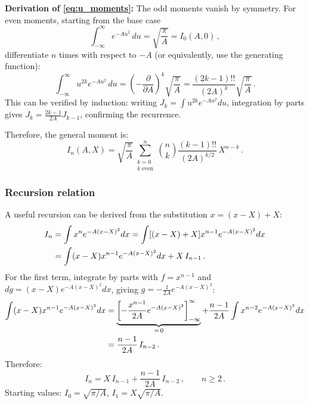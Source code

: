 \textbf{Derivation of \cref{eq:u_moments}:} The odd moments vanish by symmetry.
For even moments, starting from the base case
\begin{equation}
  \int_{-\infty}^{\infty}e^{-Au^2}\,du = \sqrt{\frac{\pi}{A}} = I_0(A,0)\,,
\end{equation}
differentiate $n$ times with respect to $-A$ (or equivalently, use the generating function):
\begin{equation}
  \int_{-\infty}^{\infty}u^{2k}e^{-Au^2}\,du
  = \left(-\frac{\partial}{\partial A}\right)^k\sqrt{\frac{\pi}{A}}
  = \frac{(2k-1)!!}{(2A)^k}\sqrt{\frac{\pi}{A}}\,.
\end{equation}
This can be verified by induction: writing $J_k = \int u^{2k}e^{-Au^2}du$, integration
by parts gives $J_k = \frac{2k-1}{2A}J_{k-1}$, confirming the recurrence.

Therefore, the general moment is:
\begin{equation}\label{eq:In_general}
  \boxed{I_n(A, X) = \sqrt{\frac{\pi}{A}}\sum_{\substack{k=0\\k\;\text{even}}}^{n}\binom{n}{k}\frac{(k-1)!!}{(2A)^{k/2}}\,X^{n-k}\,.}
\end{equation}

\subsubsection{Recursion relation}

A useful recursion can be derived from the substitution $x = (x - X) + X$:
\begin{align}
  I_n &= \int x^n e^{-A(x-X)^2}dx = \int [(x-X)+X]x^{n-1}e^{-A(x-X)^2}dx\notag\\
  &= \int(x-X)x^{n-1}e^{-A(x-X)^2}dx + X\,I_{n-1}\,.
\end{align}
For the first term, integrate by parts with $f = x^{n-1}$ and $dg = (x-X)e^{-A(x-X)^2}dx$,
giving $g = -\frac{1}{2A}e^{-A(x-X)^2}$:
\begin{align}
  \int(x-X)x^{n-1}e^{-A(x-X)^2}dx
  &= \underbrace{\left[-\frac{x^{n-1}}{2A}e^{-A(x-X)^2}\right]_{-\infty}^{\infty}}_{=\,0}
  + \frac{n-1}{2A}\int x^{n-2}e^{-A(x-X)^2}dx\notag\\
  &= \frac{n-1}{2A}\,I_{n-2}\,.
\end{align}
Therefore:
\begin{equation}\label{eq:In_recursion}
  \boxed{I_n = X\,I_{n-1} + \frac{n-1}{2A}\,I_{n-2}\,,\qquad n \geq 2\,.}
\end{equation}
Starting values: $I_0 = \sqrt{\pi/A}$, $I_1 = X\sqrt{\pi/A}$.

